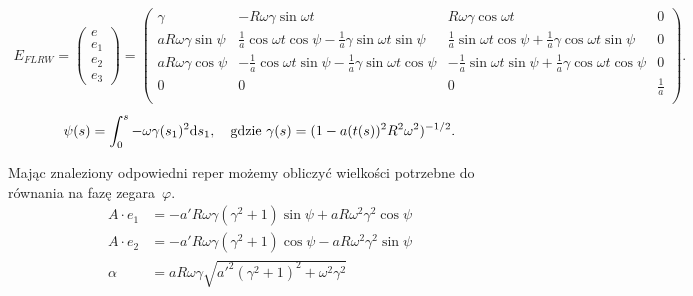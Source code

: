 \begin{align}\label{EFLRW}
E_{FLRW} = 
\begin{pmatrix}
e\\
e_1\\
e_2\\
e_3
\end{pmatrix}
=
\begin{pmatrix}
\gamma 	& -R\omega\gamma\sin\omega t 	
& R\omega\gamma\cos\omega t & 0 \\
a R\omega\gamma \sin \psi	
& \frac{1}{a} \cos\omega t \cos\psi - \frac{1}{a}\gamma \sin\omega t \sin\psi
& \frac{1}{a} \sin\omega t \cos\psi + \frac{1}{a}\gamma \cos\omega t \sin\psi
& 0 \\
a R\omega\gamma \cos \psi & -\frac{1}{a} \cos\omega t \sin\psi - 
\frac{1}{a}\gamma \sin\omega t \cos\psi
& -\frac{1}{a} \sin\omega t \sin\psi + 
\frac{1}{a}\gamma \cos\omega t \cos\psi		 & 0 \\
0&	0	& 0	& \frac{1}{a} \\
\end{pmatrix}.
\end{align}
\begin{align}\label{PsiFLRW}
\psi(s) =\int_0^s -\omega \gamma(s_1)^2  \text{d} s_1 , \quad 
\text{gdzie } \gamma(s) = (1-a(t(s))^2R^2\omega^2)^{-1/2}.
\end{align}

Mając znaleziony odpowiedni reper możemy obliczyć wielkości
potrzebne do równania na fazę zegara~$\varphi$.
\begin{align}\nonumber
A\cdot e_1 &= -a'R\omega \gamma \left( \gamma^2+1 \right)\sin\psi
 + a R \omega^2\gamma^2\cos\psi        \\
A\cdot e_2 &= -a'R\omega \gamma \left( \gamma^2+1 \right)\cos\psi
 - a R \omega^2 \gamma^2 \sin \psi      \nonumber  \\ \nonumber
\alpha &= a R \omega \gamma \sqrt{a'^2 \left(\gamma ^2+1\right)^2
 +   \omega^2\gamma^2}
\end{align}


